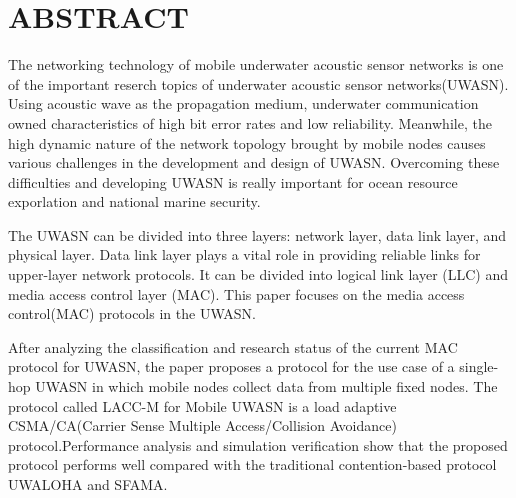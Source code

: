 \renewcommand{\baselinestretch}{1.5}
\fontsize{12pt}{13pt}\selectfont

\chapter[ABSTRACT(英文摘要)]{ABSTRACT}
The networking technology of mobile underwater acoustic sensor networks is one of the important reserch topics of underwater acoustic sensor networks(UWASN). Using acoustic wave as the propagation medium, underwater communication owned characteristics of high bit error rates and low reliability. Meanwhile, the high dynamic nature of the network topology brought by mobile nodes causes various challenges in the development and design of UWASN. Overcoming these difficulties and developing UWASN is really important for ocean resource exporlation and national marine security.

The UWASN can be divided into three layers: network layer, data link layer, and physical layer. Data link layer plays a vital role in providing reliable links for upper-layer network protocols. It can be divided into logical link layer (LLC) and media access control layer (MAC). This paper focuses on the  media access control(MAC) protocols in the UWASN.

After analyzing the classification and research status of the current MAC protocol for UWASN, the paper proposes a protocol for the use case of a single-hop UWASN in which mobile nodes collect data from multiple fixed nodes.
The protocol called LACC-M for Mobile UWASN is a load adaptive CSMA/CA(Carrier Sense Multiple Access/Collision Avoidance) protocol.Performance analysis and simulation verification show that the proposed protocol performs well compared with the traditional contention-based protocol UWALOHA and SFAMA.

